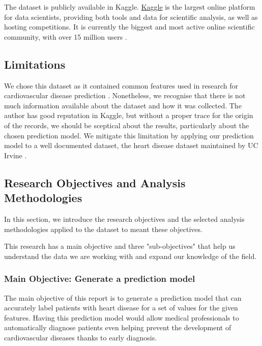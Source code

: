 The dataset is publicly available in Kaggle. \href{https://www.kaggle.com/}{Kaggle} is the largest online platform for data scientists, providing both
tools and data for scientific analysis, as well as hosting competitions. It is currently the biggest and
most active online scientific community, with over 15 million users \cite{Kaggle}.

\subsection{Limitations}

We chose this dataset as it contained common features used in research for cardiovascular disease prediction \cite{STSegmentChanges}
\cite{STSlopePredictor} \cite{STSlopePredictorComparison}. Nonetheless, we recognise that there is not much information available
about the dataset and how it was collected. The author has good reputation in Kaggle, but without a proper trace for the origin of
the records, we should be sceptical about the results, particularly about the chosen prediction model.
We mitigate this limitation by applying our prediction model to a well documented dataset, the heart disease dataset maintained by
UC Irvine \cite{HeartDiseaseDataset}.

\subsection{Research Objectives and Analysis Methodologies}

In this section, we introduce the research objectives and the selected analysis methodologies applied to the dataset
to meant these objectives.

This research has a main objective and three "sub-objectives" that help us understand the data we are working with
and expand our knowledge of the field.

\subsubsection{Main Objective: Generate a prediction model}

The main objective of this report is to generate a prediction model that can accurately label patients with heart disease
for a set of values for the given features. Having this prediction model would allow medical professionals to automatically
diagnose patients even helping prevent the development of cardiovascular diseases thanks to early diagnosis.

